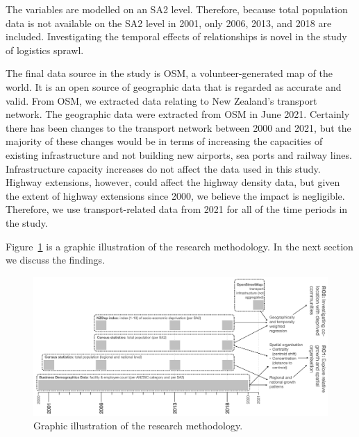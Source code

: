 \documentclass[3p, a4paper, authoryear, 11pt, fleqn, review]{elsarticle}
\newcommand{\nmt}[1]{{\color{ForestGreen}{~(nmt: #1)}}}
\begin{document}
The variables are modelled on an \ac{SA2} level. Therefore, because total population data is not available on the \ac{SA2} level in 2001, only 2006, 2013, and 2018 are included. Investigating the temporal effects of relationships is novel in the study of logistics sprawl. \nmt{Insert quick recap of literature to prove}


The final data source in the study is \ac{OSM}, a volunteer-generated map of the world. It is an open source of geographic data that is regarded as accurate and valid. From \ac{OSM}, we extracted data relating to New Zealand's transport network. The geographic data were extracted from \ac{OSM} in June 2021. Certainly there has been changes to the transport network between 2000 and 2021, but the majority of these changes would be in terms of increasing the capacities of existing infrastructure and not building new airports, sea ports and railway lines. Infrastructure capacity increases do not affect the data used in this study. Highway extensions, however, could affect the highway density data, but given the extent of highway extensions since 2000, we believe the impact is negligible.\nmt{I still have to substantiate this somehow.} Therefore, we use transport-related data from 2021 for all of the time periods in the study.

Figure~\ref{fig:method} is a graphic illustration of the research methodology. In the next section we discuss the findings.  

\begin{figure}[h!]
    \centering
    \includegraphics[width=0.9\linewidth]{methodology.png}
    \caption{Graphic illustration of the research methodology.}
    \label{fig:method}
\end{figure}

\end{document}
